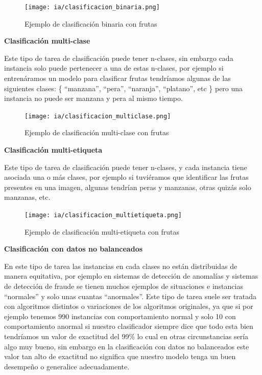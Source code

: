 \documentclass[11pt,fleqn]{book} %
\begin{document}
\begin{figure}[ht]
\centering\texttt{[image: ia/clasificacion\_binaria.png]}
\caption{Ejemplo de clasificación binaria con frutas}

\label{fig:clasificacion_binaria} 
\end{figure}

\FloatBarrier

\textbf{Clasificación multi-clase}

Este tipo de tarea de clasificación puede tener n-clases, sin embargo cada instancia solo puede pertenecer a una de estas n-clases, por ejemplo si entrenáramos un modelo para clasificar frutas tendríamos algunas de las siguientes clases: \{ ``manzana'', ``pera'', ``naranja'', ``platano'', etc \} pero una instancia no puede ser manzana y pera al mismo tiempo.

\begin{figure}[ht]
\centering\texttt{[image: ia/clasificacion\_multiclase.png]}
\caption{Ejemplo de clasificación multi-clase con frutas}

\label{fig:clasificacion_multiclase} 
\end{figure}

\FloatBarrier

\textbf{Clasificación multi-etiqueta}

Este tipo de tarea de clasificación puede tener n-clases, y cada instancia tiene asociada una o más clases, por ejemplo si tuviéramos que identificar las frutas presentes en una imagen, algunas tendrían peras y manzanas, otras quizás solo manzanas, etc.

\begin{figure}[ht]
\centering\texttt{[image: ia/clasificacion\_multietiqueta.png]}
\caption{Ejemplo de clasificación multi-etiqueta con frutas}

\label{fig:clasificacion_multietiqueta} 
\end{figure}

\FloatBarrier


\textbf{Clasificación con datos no balanceados}

En este tipo de tarea las instancias en cada clases no están distribuidas de manera equitativa, por ejemplo en sistemas de detección de anomalías y sistemas de detección de fraude se tienen muchos ejemplos de situaciones e instancias ``normales'' y solo unas cuantas ``anormales''.
Este tipo de tarea suele ser tratada con algoritmos distintos o variaciones de los algoritmos originales, ya que si por ejemplo tenemos 990 instancias con comportamiento normal y solo 10 con comportamiento anormal si nuestro clasificador siempre dice que todo esta bien tendríamos un valor de exactitud del 99\% lo cual en otras circunstancias sería algo muy bueno, sin embargo en la clasificación  con datos no balanceados este valor tan alto de exactitud no significa que nuestro modelo tenga un buen desempeño o generalice adecuadamente.
\end{document}
